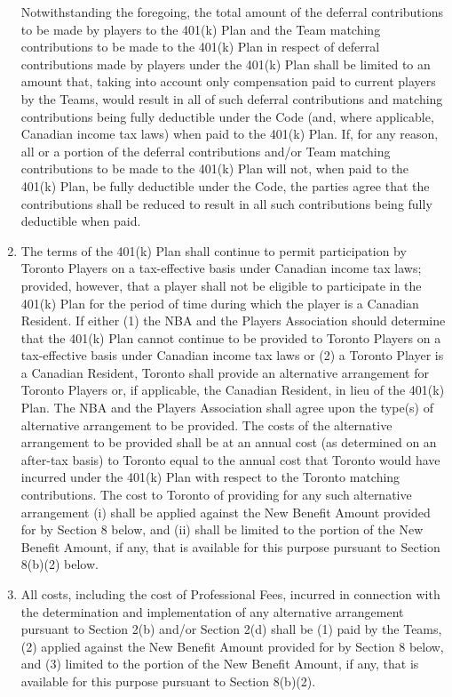 \documentclass[
]{book}
\begin{document}
\begin{enumerate}
  Notwithstanding the foregoing, the total amount of the deferral contributions to be made by players to the 401(k) Plan and the Team matching contributions to be made to the 401(k) Plan in respect of deferral contributions made by players under the 401(k) Plan shall be limited to an amount that, taking into account only compensation paid to current players by the Teams, would result in all of such deferral contributions and matching contributions being fully deductible under the Code (and, where applicable, Canadian income tax laws) when paid to the 401(k) Plan. If, for any reason, all or a portion of the deferral contributions and/or Team matching contributions to be made to the 401(k) Plan will not, when paid to the 401(k) Plan, be fully deductible under the Code, the parties agree that the contributions shall be reduced to result in all such contributions being fully deductible when paid.
\item
  The terms of the 401(k) Plan shall continue to permit participation by Toronto Players on a tax-effective basis under Canadian income tax laws; provided, however, that a player shall not be eligible to participate in the 401(k) Plan for the period of time during which the player is a Canadian Resident. If either (1) the NBA and the Players Association should determine that the 401(k) Plan cannot continue to be provided to Toronto Players on a tax-effective basis under Canadian income tax laws or (2) a Toronto Player is a Canadian Resident, Toronto shall provide an alternative arrangement for Toronto Players or, if applicable, the Canadian Resident, in lieu of the 401(k) Plan. The NBA and the Players Association shall agree upon the type(s) of alternative arrangement to be provided. The costs of the alternative arrangement to be provided shall be at an annual cost (as determined on an after-tax basis) to Toronto equal to the annual cost that Toronto would have incurred under the 401(k) Plan with respect to the Toronto matching contributions. The cost to Toronto of providing for any such alternative arrangement (i) shall be applied against the New Benefit Amount provided for by Section 8 below, and (ii) shall be limited to the portion of the New Benefit Amount, if any, that is available for this purpose pursuant to Section 8(b)(2) below.
\item
  All costs, including the cost of Professional Fees, incurred in connection with the determination and implementation of any alternative arrangement pursuant to Section 2(b) and/or Section 2(d) shall be (1) paid by the Teams, (2) applied against the New Benefit Amount provided for by Section 8 below, and (3) limited to the portion of the New Benefit Amount, if any, that is available for this purpose pursuant to Section 8(b)(2).

\end{enumerate}
\end{document}
